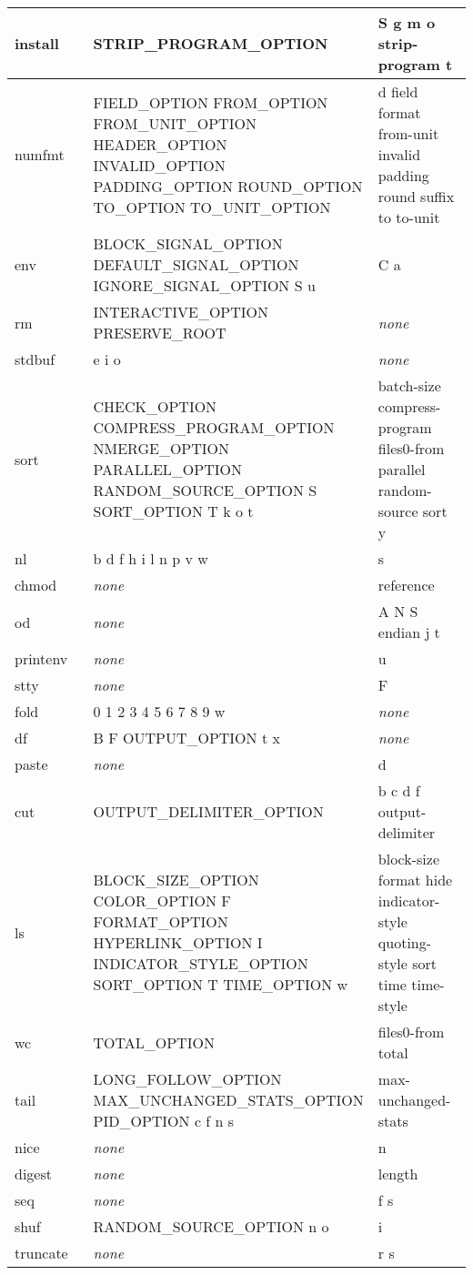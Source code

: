 \begin{longtable}{|p{0.3\linewidth}|p{0.4\linewidth}|p{0.3\linewidth}|}
\hline
install & STRIP\_PROGRAM\_OPTION & S g m o strip-program t\\ 
\hline
numfmt & FIELD\_OPTION FROM\_OPTION FROM\_UNIT\_OPTION HEADER\_OPTION INVALID\_OPTION PADDING\_OPTION ROUND\_OPTION TO\_OPTION TO\_UNIT\_OPTION & d field format from-unit invalid padding round suffix to to-unit\\ 
\hline
env & BLOCK\_SIGNAL\_OPTION DEFAULT\_SIGNAL\_OPTION IGNORE\_SIGNAL\_OPTION S u & C a\\ 
\hline
rm & INTERACTIVE\_OPTION PRESERVE\_ROOT &  \textit{none}\\ 
\hline
stdbuf & e i o &  \textit{none}\\ 
\hline
sort & CHECK\_OPTION COMPRESS\_PROGRAM\_OPTION NMERGE\_OPTION PARALLEL\_OPTION RANDOM\_SOURCE\_OPTION S SORT\_OPTION T k o t & batch-size compress-program files0-from parallel random-source sort y\\ 
\hline
nl & b d f h i l n p v w & s\\ 
\hline
chmod &  \textit{none} &reference\\ 
\hline
od &  \textit{none} &A N S endian j t\\ 
\hline
printenv &  \textit{none} &u\\ 
\hline
stty &  \textit{none} &F\\ 
\hline
fold & 0 1 2 3 4 5 6 7 8 9 w &  \textit{none}\\ 
\hline
df & B F OUTPUT\_OPTION t x &  \textit{none}\\ 
\hline
paste &  \textit{none} &d\\ 
\hline
cut & OUTPUT\_DELIMITER\_OPTION & b c d f output-delimiter\\ 
\hline
ls & BLOCK\_SIZE\_OPTION COLOR\_OPTION F FORMAT\_OPTION HYPERLINK\_OPTION I INDICATOR\_STYLE\_OPTION SORT\_OPTION T TIME\_OPTION w & block-size format hide indicator-style quoting-style sort time time-style\\ 
\hline
wc & TOTAL\_OPTION & files0-from total\\ 
\hline
tail & LONG\_FOLLOW\_OPTION MAX\_UNCHANGED\_STATS\_OPTION PID\_OPTION c f n s & max-unchanged-stats\\ 
\hline
nice &  \textit{none} &n\\ 
\hline
digest &  \textit{none} &length\\ 
\hline
seq &  \textit{none} &f s\\ 
\hline
shuf & RANDOM\_SOURCE\_OPTION n o & i\\ 
\hline
truncate &  \textit{none} &r s\\ 

\end{longtable}
